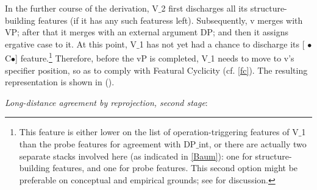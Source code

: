 \documentclass[output=paper
,modfonts
,nonflat]{langsci/langscibook}
\begin{document}
 In the further course of the derivation, V$\_$2 first discharges all its
 structure-building features (if it has any such featuress
 left). Subsequently, v merges with VP; after that it merges 
 with an external argument DP; and then it assigns ergative case to it. At
 this point, V$\_$1 has not yet had a chance to discharge its [{\small
    $\bullet$}C{\small $\bullet$}] feature.\footnote{This
   feature is either lower on the list of operation-triggering
   features of V$\_$1 than the probe features for agreement with
   DP$\_${int}, or there are actually two separate stacks involved here
   (as indicated in \ref{Baum}):
   one for structure-building features, and one for probe
   features. This second option might be preferable on conceptual and empirical
   grounds; see \cite{Mueller:04:arg,Mueller:09:eao} for discussion.}
  Therefore, before
 the vP is completed, V$\_$1 needs to move to v's specifier position, so
 as to comply with Featural Cyclicity (cf. \ref{fc}). The resulting
 representation is shown in (\Next).

\ea\label{ex:mueller:33} {\itshape Long-distance agreement \label{Baum2}by reprojection, second
stage}:\\
\z
\end{document}
